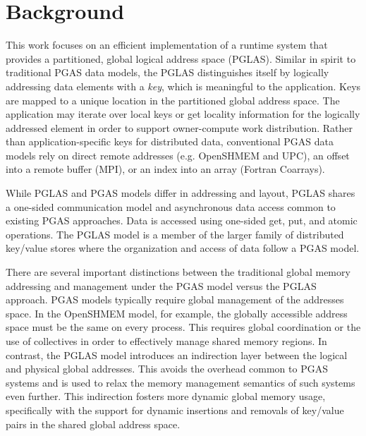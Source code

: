 \section{Background}

This work focuses on an efficient implementation of a runtime system that
provides a partitioned, global logical address space (PGLAS). Similar in spirit
to traditional PGAS data models, the PGLAS distinguishes itself by logically
addressing data elements with a {\em key}, which is meaningful to the
application. Keys are mapped to a unique location in the partitioned global
address space. The application may iterate over local keys or get locality
information for the logically addressed element in order to support
owner-compute work distribution. Rather than application-specific keys for distributed
data, conventional PGAS data models rely on direct remote addresses (e.g. OpenSHMEM
and UPC), an offset into a remote buffer (MPI), or an index into an array
(Fortran Coarrays). 

While PGLAS and PGAS models differ in addressing and layout, PGLAS shares a
one-sided communication model and asynchronous data access common to existing
PGAS approaches. Data is accessed using one-sided get, put, and atomic operations.
The PGLAS model is a member of the larger family of distributed key/value stores where
the organization and access of data follow a PGAS model.


There are several important distinctions between the traditional global memory
addressing and management under the PGAS model versus the PGLAS approach. PGAS
models typically require global management of the addresses space. In the
OpenSHMEM model, for example, the globally accessible address space must be the
same on every process. This requires global coordination or the use of
collectives in order to effectively manage shared memory regions. In contrast,
the PGLAS model introduces an indirection layer between the logical and
physical global addresses. This avoids the overhead common to PGAS systems and
is used to relax the memory management semantics of such systems even further.
This indirection fosters more dynamic global memory usage, specifically with
the support for dynamic insertions and removals of key/value pairs in the
shared global address space. 

